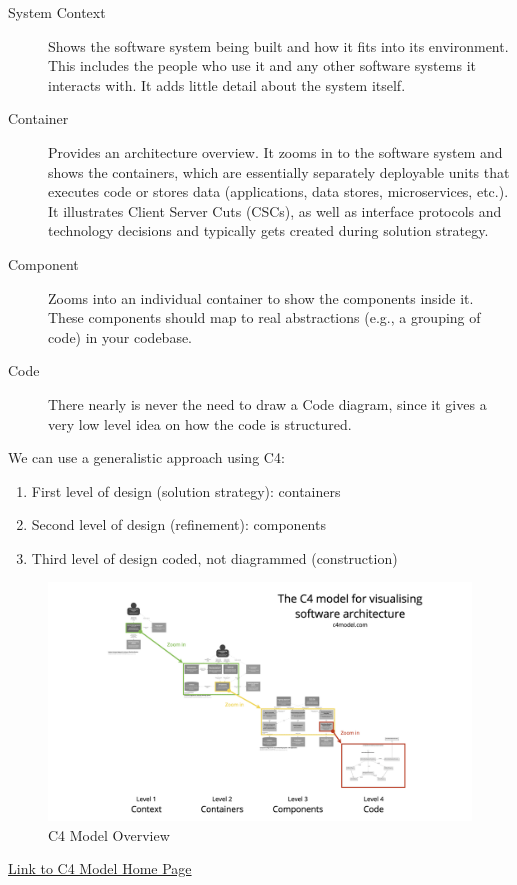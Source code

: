 \documentclass[../Main.tex]{subfiles}
\begin{document}
\begin{description}
        \item [System Context] Shows the software system being built and how it fits into its environment. This includes the people who use it and
        any other software systems it interacts with. It adds little detail about the system itself.
        \item[Container] Provides an architecture overview. It zooms in to the software system and shows the containers, which are essentially
        separately deployable units that executes code or stores data (applications, data stores, microservices, etc.). It
        illustrates Client Server Cuts (CSCs), as well as interface protocols and technology decisions and typically gets
        created during solution strategy.
        \item[Component] Zooms into an individual container to show the components inside it. These components should map to real
        abstractions (e.g., a grouping of code) in your codebase.
        \item[Code] There nearly is never the need to draw a Code diagram, since it gives a very low level idea on how the
        code is structured.
\end{description}

We can use a generalistic approach using C4:
\begin{enumerate}
    \item First level of design (solution strategy): containers
    \item Second level of design (refinement): components
    \item Third level of design coded, not diagrammed (construction)
\end{enumerate}

\begin{figure}[H]
    \centering
    \includegraphics[]{Images/c4-overview.png}
    \caption{C4 Model Overview}
\end{figure}
\href{https://c4model.com/}{Link to C4 Model Home Page}
\end{document}
